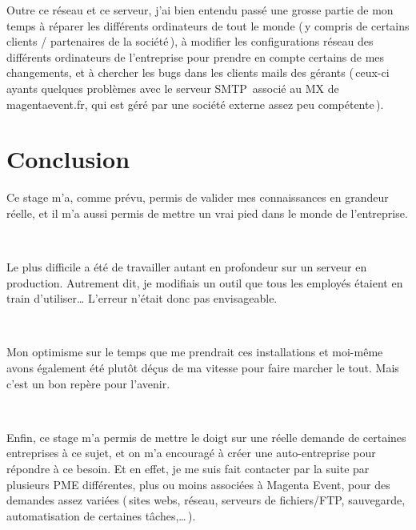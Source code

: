 \documentclass[10pt]{article}
\begin{document}
  Outre ce réseau et ce serveur, j’ai bien entendu passé une grosse partie de mon temps à réparer les différents ordinateurs de tout le monde (\,y compris de certains clients / partenaires de la société\,), à modifier les configurations réseau des différents ordinateurs de l’entreprise pour prendre en compte certains de mes changements, et à chercher les bugs dans les clients mails des gérants (\,ceux-ci ayants quelques problèmes avec le serveur SMTP associé au MX de magentaevent.fr, qui est géré par une société externe assez peu compétente\,).

 \section*{Conclusion}

 Ce stage m’a, comme prévu, permis de valider mes connaissances en grandeur réelle, et il m’a aussi permis de mettre un vrai pied dans le monde de l’entreprise. 
 
 \,

 Le plus difficile a été de travailler autant en profondeur sur un serveur en production. Autrement dit, je modifiais un outil que tous les employés étaient en train d’utiliser… L’erreur n’était donc pas envisageable.

\,
 
 Mon optimisme sur le temps que me prendrait ces installations et moi-même avons également été plutôt déçus de ma vitesse pour faire marcher le tout. Mais c’est un bon repère pour l’avenir.

\,

 Enfin, ce stage m’a permis de mettre le doigt sur une réelle demande de certaines entreprises à ce sujet, et on m’a encouragé à créer une auto-entreprise pour répondre à ce besoin. Et en effet, je me suis fait contacter par la suite par plusieurs PME différentes, plus ou moins associées à Magenta Event, pour des demandes assez variées (\,sites webs, réseau, serveurs de fichiers/FTP, sauvegarde, automatisation de certaines tâches,…\,).
\end{document}
